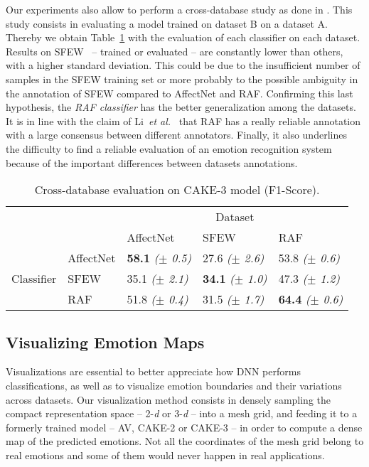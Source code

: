 \documentclass{bmvc2k}
\begin{document}
Our experiments also allow to perform a cross-database study as done in \cite{li_reliable_2017}. This study consists in evaluating a model trained on dataset B on a dataset A. Thereby we obtain Table~\ref{table:cross_f1} with the evaluation of each classifier on each dataset.
Results on SFEW~\cite{dhall_static_2011} -- trained or evaluated -- are constantly lower than others, with a higher standard deviation. This could be due to the insufficient number of samples in the SFEW training set or more probably to the possible ambiguity in the annotation of SFEW compared to AffectNet and RAF. Confirming this last hypothesis, the \textit{RAF classifier} has the better generalization among the datasets. It is in line with the claim of Li~\textit{et al.}~\cite{li_reliable_2017} that RAF has a really reliable annotation with a large consensus between different annotators. Finally, it also underlines the difficulty to find a reliable evaluation of an emotion recognition system because of the important differences between datasets annotations.

\begin{table}
\begin{tabular}{cl|l|l|l|}
\cline{3-5}
\multicolumn{1}{l}{}                                       &           & \multicolumn{3}{c|}{Dataset}                     \\ \cline{3-5} 
\multicolumn{1}{l}{}                                       &           & AffectNet         & SFEW              & RAF      \\ \hline
\multicolumn{1}{|c|}{\multirow{3}{*}{Classifier}} & AffectNet & \textbf{58.1 } \textit{($\pm$ 0.5)} & 27.6 \textit{($\pm$ 2.6)}          & 53.8  \textit{($\pm$ 0.6)} \\ \cline{2-5} 
\multicolumn{1}{|c|}{}                                     & SFEW      & 35.1  \textit{($\pm$ 2.1)}          & \textbf{34.1 } \textit{($\pm$ 1.0)} & 47.3  \textit{($\pm$ 1.2)} \\ \cline{2-5} 
\multicolumn{1}{|c|}{}                                     & RAF       & 51.8  \textit{($\pm$ 0.4)}          & 31.5  \textit{($\pm$ 1.7)}         & \textbf{64.4 } \textit{($\pm$ 0.6)} \\ \hline
\end{tabular}
\caption{Cross-database evaluation on CAKE-3 model (F1-Score).}
\label{table:cross_f1}
\end{table} \subsection{Visualizing Emotion Maps}
Visualizations are essential to better appreciate how DNN performs classifications, as well as to visualize emotion boundaries and their variations across datasets. Our visualization method consists in densely sampling the compact representation space -- 2-\textit{d} or 3-\textit{d} -- into a mesh grid, and feeding it to a formerly trained model -- AV, CAKE-2 or CAKE-3 -- in order to compute a dense map of the predicted emotions. Not all the coordinates of the mesh grid belong to real emotions and some of them would never happen in real applications. 
\end{document}
